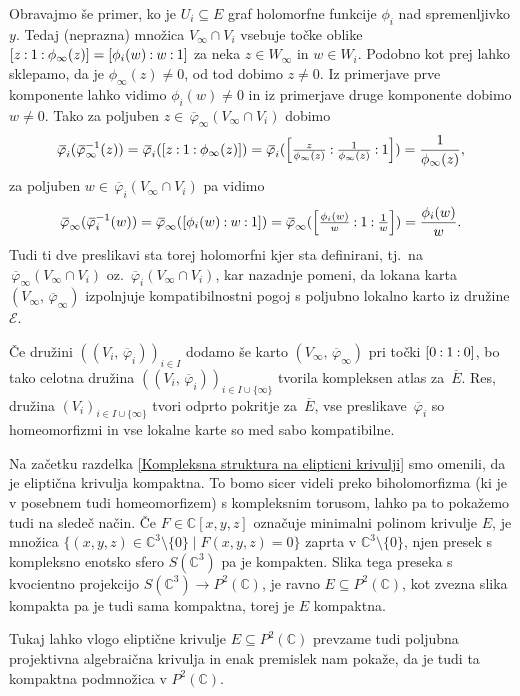 \documentclass[mat1]{fmfdelo}
\numberwithin{equation}{section}
\newcommand{\C}{\mathbb C}
\newcommand{\PC}{P^2(\mathbb C)}
\newcommand{\inv}{^{-1}}
\newcommand{\pcoor}[1]{%
\begingroup\lccode`~=`: \lowercase{\endgroup
\edef~}{\mathbin{\mathchar\the\mathcode`:}\nobreak}%
\left[%
\begingroup
\mathcode`:=\string"8000
#1%
\endgroup
\right]%
}
\newcommand{\olsi}[1]{\,\overline{\!{#1}}} %
\newcommand{\tj}{tj.\ }
\theoremstyle{definition}
\begin{document}
Obravajmo še primer, ko je $U_i \subseteq E$ graf holomorfne funkcije $\phi_i$ nad spremenljivko $y$. Tedaj (neprazna) množica $V_\infty \cap V_i$ vsebuje točke oblike $\pcoor{z : 1 : \phi_\infty(z)} = \pcoor{\phi_i(w) : w : 1}$ za neka $z \in W_\infty$ in $w \in W_i$. Podobno kot prej lahko sklepamo, da je $\phi_\infty(z) \neq 0$, od tod dobimo $z \neq 0$. Iz primerjave prve komponente lahko vidimo $\phi_i(w) \neq 0$ in iz primerjave druge komponente dobimo $w \neq 0$. Tako za poljuben $z \in \olsi{\varphi}_\infty(V_\infty \cap V_i)$ dobimo
\[
    \olsi{\varphi}_i (\olsi{\varphi}_\infty\inv (z)) = 
    \olsi{\varphi}_i (\pcoor{z : 1 : \phi_\infty(z)}) = 
    \olsi{\varphi}_i (\pcoor{\tfrac{z}{\phi_\infty(z)} : \tfrac{1}{\phi_\infty(z)} : 1}) = 
    \frac{1}{\phi_\infty(z)},
\]
za poljuben $w \in \olsi{\varphi}_i(V_\infty \cap V_i)$ pa vidimo
\[
    \olsi{\varphi}_\infty (\olsi{\varphi}_i\inv(w)) =
    \olsi{\varphi}_\infty (\pcoor{\phi_i(w) : w : 1}) =
    \olsi{\varphi}_\infty (\pcoor{\tfrac{\phi_i(w)}{w} : 1 : \tfrac{1}{w}}) = 
    \frac{\phi_i(w)}{w}.
\]
Tudi ti dve preslikavi sta torej holomorfni kjer sta definirani, \tj na $\olsi{\varphi}_\infty(V_\infty \cap V_i)$ oz. $\olsi{\varphi}_i(V_\infty \cap V_i)$, kar nazadnje pomeni, da lokana karta $(V_\infty, \olsi{\varphi}_\infty)$ izpolnjuje kompatibilnostni pogoj s poljubno lokalno karto iz družine $\mathcal{E}$.

Če družini $((V_i, \olsi{\varphi}_i))_{i \in I}$ dodamo še karto $(V_\infty, \olsi{\varphi}_\infty)$ pri točki $\pcoor{0 : 1 : 0}$, bo tako celotna družina $((V_i,\olsi{\varphi}_i))_{i \in I \cup \{\infty\}}$ tvorila kompleksen atlas za $\olsi{E}$. Res, družina $(V_i)_{i \in I \cup \{\infty\}}$ tvori odprto pokritje za $\olsi{E}$, vse preslikave $\olsi{\varphi}_i$ so homeomorfizmi in vse lokalne karte so med sabo kompatibilne. 

\begin{zgled*}
    
\end{zgled*}

\begin{opomba}
    Na začetku razdelka \ref{Kompleksna struktura na elipticni krivulji} smo omenili, da je eliptična krivulja kompaktna. To bomo sicer videli preko biholomorfizma (ki je v posebnem tudi homeomorfizem) s kompleksnim torusom, lahko pa to pokažemo tudi na sledeč način. Če $F \in \C[x,y,z]$ označuje minimalni polinom krivulje $E$, je množica $\{ (x,y,z) \in \C^3\setminus\{0\} \mid F(x,y,z) = 0\}$ zaprta v $\C^3\setminus\{0\}$, njen presek s kompleksno enotsko sfero $S(\C^3)$ pa je kompakten. Slika tega preseka s kvocientno projekcijo $S(\C^3) \to \PC$, je ravno $E\subseteq \PC$, kot zvezna slika kompakta pa je tudi sama kompaktna, torej je $E$ kompaktna. 
    
    Tukaj lahko vlogo eliptične krivulje $E \subseteq \PC$ prevzame tudi poljubna projektivna algebraična krivulja in enak premislek nam pokaže, da je tudi ta kompaktna podmnožica v $\PC$.
\end{opomba}
\end{document}
